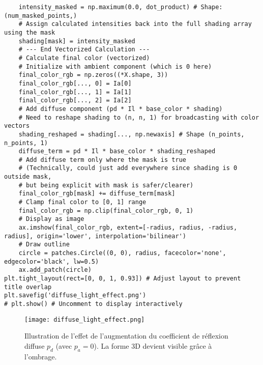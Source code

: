 \begin{verbatim}
    intensity_masked = np.maximum(0.0, dot_product) # Shape: (num_masked_points,)
    # Assign calculated intensities back into the full shading array using the mask
    shading[mask] = intensity_masked
    # --- End Vectorized Calculation ---
    # Calculate final color (vectorized)
    # Initialize with ambient component (which is 0 here)
    final_color_rgb = np.zeros((*X.shape, 3))
    final_color_rgb[..., 0] = Ia[0]
    final_color_rgb[..., 1] = Ia[1]
    final_color_rgb[..., 2] = Ia[2]
    # Add diffuse component (pd * Il * base_color * shading)
    # Need to reshape shading to (n, n, 1) for broadcasting with color vectors
    shading_reshaped = shading[..., np.newaxis] # Shape (n_points, n_points, 1)
    diffuse_term = pd * Il * base_color * shading_reshaped
    # Add diffuse term only where the mask is true
    # (Technically, could just add everywhere since shading is 0 outside mask,
    # but being explicit with mask is safer/clearer)
    final_color_rgb[mask] += diffuse_term[mask]
    # Clamp final color to [0, 1] range
    final_color_rgb = np.clip(final_color_rgb, 0, 1)
    # Display as image
    ax.imshow(final_color_rgb, extent=[-radius, radius, -radius, radius], origin='lower', interpolation='bilinear')
    # Draw outline
    circle = patches.Circle((0, 0), radius, facecolor='none', edgecolor='black', lw=0.5)
    ax.add_patch(circle)
plt.tight_layout(rect=[0, 0, 1, 0.93]) # Adjust layout to prevent title overlap
plt.savefig('diffuse_light_effect.png')
# plt.show() # Uncomment to display interactively
\end{verbatim}
\begin{figure}[H]
\centering
\texttt{[image: diffuse\_light\_effect.png]}
\caption{Illustration de l'effet de l'augmentation du coefficient de réflexion diffuse \(p_d\) (avec \(p_a=0\)). La forme 3D devient visible grâce à l'ombrage.}
\label{fig:diffuse_light_effect}
\end{figure}
